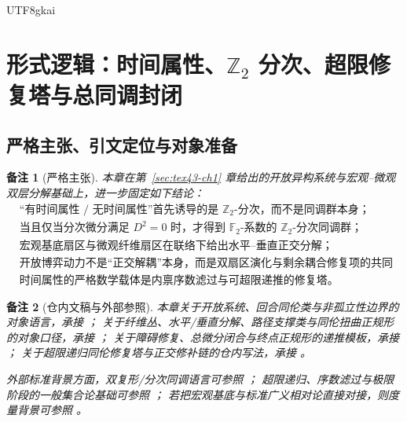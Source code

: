 \documentclass[12pt]{article}
\newtheorem{remark}{备注}[section]
\newcommand{\Ztwo}{\mathbb{Z}_2}
\newcommand{\Ftwo}{\mathbb{F}_2}
\begin{document}
\begin{CJK*}{UTF8}{gkai}
\clearpage

\section{形式逻辑：时间属性、\texorpdfstring{$\Ztwo$}{Z2} 分次、超限修复塔与总同调封闭}
\label{sec:tex43-ch2}

\subsection{严格主张、引文定位与对象准备}
\label{subsec:tex43-ch2-convention}

\begin{remark}[严格主张]
本章在第~\ref{sec:tex43-ch1} 章给出的开放异构系统与宏观--微观双层分解基础上，进一步固定如下结论：
\[
  \boxed{
    \begin{aligned}
      &\text{“有时间属性 / 无时间属性”首先诱导的是 }\Ztwo\text{-分次，而不是同调群本身；}\\
      &\text{当且仅当分次微分满足 }D^2=0\text{ 时，才得到 }\Ftwo\text{-系数的 }\Ztwo\text{-分次同调群；}\\
      &\text{宏观基底扇区与微观纤维扇区在联络下给出水平--垂直正交分解；}\\
      &\text{开放博弈动力不是“正交解耦”本身，而是双扇区演化与剩余耦合修复项的共同作用；}\\
      &\text{时间属性的严格数学载体是内禀序数滤过与可超限递推的修复塔。}
    \end{aligned}
  }
\]
\end{remark}

\begin{remark}[仓内文稿与外部参照]
本章关于开放系统、回合同伦类与非孤立性边界的对象语言，承接
\cite{RepoTex23OpenSystemGame,RepoTex39StatRepair}；
关于纤维丛、水平/垂直分解、路径支撑类与同伦扭曲正规形的对象口径，承接
\cite{RepoTex36HomotopyTwistBijection}；
关于障碍修复、总微分闭合与终点正规形的递推模板，承接
\cite{RepoTex38JacobiBianchiRepair,GaoZheng2025GFramework}；
关于超限递归同伦修复塔与正交修补链的仓内写法，承接
\cite{RepoTex29RepairableObstruction,RepoTex27PowerdomainFiberExtension}。

外部标准背景方面，双复形/分次同调语言可参照
\cite{Weibel1994HomologicalAlgebra,Hatcher2002AT}；
超限递归、序数滤过与极限阶段的一般集合论基础可参照
\cite{Jech2003SetTheory,Kunen2011SetTheory}；
若把宏观基底与标准广义相对论直接对接，则度量背景可参照
\cite{KobayashiNomizu1963Foundations}。
\end{remark}


\end{CJK*}
\end{document}
